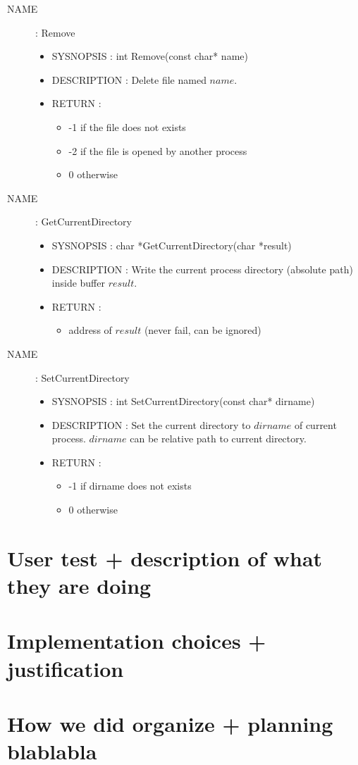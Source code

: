 \documentclass[a4paper,10pt]{article}
\begin{document}
\begin{description}
    \item [NAME] : Remove
        \begin{itemize}
            \item SYSNOPSIS : int Remove(const char* name)
            \item DESCRIPTION :
                Delete file named $name$.
            \item RETURN :
                \begin{itemize}
                    \item -1 if the file does not exists
                    \item -2 if the file is opened by another process
                    \item 0 otherwise
                \end{itemize}
        \end{itemize}

    \item [NAME] : GetCurrentDirectory
        \begin{itemize}
            \item SYSNOPSIS : char *GetCurrentDirectory(char *result)
            \item DESCRIPTION :
                Write the current process directory (absolute path) inside buffer $result$.
            \item RETURN :
                \begin{itemize}
                    \item address of $result$ (never fail, can be ignored)
                \end{itemize}
        \end{itemize}

    \item [NAME] : SetCurrentDirectory
        \begin{itemize}
            \item SYSNOPSIS : int SetCurrentDirectory(const char* dirname)
            \item DESCRIPTION :
                Set the current directory to $dirname$ of current process.
                $dirname$ can be relative path to current directory.
            \item RETURN :
                \begin{itemize}
                    \item -1 if dirname does not exists
                    \item 0 otherwise
                \end{itemize}
        \end{itemize}
    \end{description}

\section{User test + description of what they are doing}
\section{Implementation choices + justification}
\section{How we did organize + planning blablabla}
\end{document}
